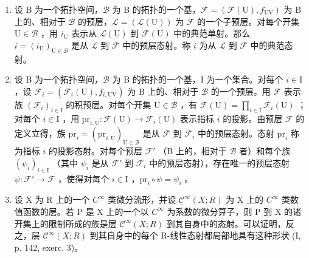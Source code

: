 \begin{enumerate}
\def\labelenumi{\arabic{enumi})}
\setcounter{enumi}{1}
\item
  设 B 为一个拓扑空间，\(\mathcal{B}\) 为 B 的拓扑的一个基，\(\mathcal{F} = (\mathcal{F}(\mathrm{U}), f_{\mathrm{UV}})\) 为 B 上的、相对于 \(\mathcal{B}\) 的预层，\(\mathcal{L} = (\mathcal{L}(\mathrm{U}))\) 为 \(\mathcal{F}\) 的一个子预层。对每个开集 \(\mathrm{U} \in \mathcal{B}\) ，用 \(i_{\mathrm{U}}\) 表示从 \(\mathcal{L}(\mathrm{U})\) 到 \(\mathcal{F}(\mathrm{U})\) 中的典范单射。那么 \(i = (i_{\mathrm{U}})_{\mathrm{U} \in \mathcal{B}}\) 是从 \(\mathcal{L}\) 到 \(\mathcal{F}\) 中的预层态射。称 \(i\) 为从 \(\mathcal{L}\) 到 \(\mathcal{F}\) 中的典范态射。
\item
  设 B 为一个拓扑空间，\(\mathcal{B}\) 为 B 的拓扑的一个基，I 为一个集合。对每个 \(i\in\mathrm{I}\) ，设 \(\mathcal{F}_{i}=(\mathcal{F}_{i}(\mathrm{U}),f_{i,\mathrm{UV}})\) 为 B 上的、相对于 \(\mathcal{B}\) 的一个预层。用 \(\mathcal{F}\) 表示族 \((\mathcal{F}_{i})_{i\in\mathrm{I}}\) 的积预层。对每个开集 \(\mathrm{U}\in\mathcal{B}\) ，有 \(\mathcal{F}(\mathrm{U})=\prod_{i\in\mathrm{I}}\mathcal{F}_{i}(\mathrm{U})\) ；对每个 \(i\in\mathrm{I}\) ，用 \(\mathrm{pr}_{i,\mathrm{U}}\colon\mathcal{F}(\mathrm{U})\to\mathcal{F}_{i}(\mathrm{U})\) 表示指标 \(i\) 的投影。由预层 \(\mathcal{F}\) 的定义立得，族 \(\mathrm{pr}_{i}=(\mathrm{pr}_{i,\mathrm{U}})_{\mathrm{U}\in\mathcal{B}}\) 是从 \(\mathcal{F}\) 到 \(\mathcal{F}_{i}\) 中的预层态射。态射 \(\mathrm{pr}_{i}\) 称为指标 \(i\) 的投影态射。对每个预层 \(\mathcal{F}'\) （B 上的，相对于 \(\mathcal{B}\) 者）和每个族 \((\psi_{i})_{i\in\mathrm{I}}\) （其中 \(\psi_{i}\) 是从 \(\mathcal{F}'\) 到 \(\mathcal{F}_{i}\) 中的预层态射），存在唯一的预层态射 \(\psi\colon\mathcal{F}'\to\mathcal{F}\) ，使得对每个 \(i\in\mathrm{I}\) ，\(\mathrm{pr}_{i}\circ\psi=\psi_{i}\) 。
\item
  设 X 为 R 上的一个 \(C^{\infty}\) 类微分流形，并设 \(\underline{\mathcal{C}}^{\infty}(X;R)\) 为 X 上的 \(C^{\infty}\) 类数值函数的层。若 P 是 X 上的一个以 \(C^{\infty}\) 为系数的微分算子，则 P 到 X 的诸开集上的限制所成的族是层 \(\underline{\mathcal{C}}^{\infty}(X;R)\) 到其自身中的态射。可以证明，反之，层 \(\underline{\mathcal{C}}^{\infty}(X;R)\) 到其自身中的每个 R-线性态射都局部地具有这种形状 (I, p. 142, exerc. 3)。
\end{enumerate}

